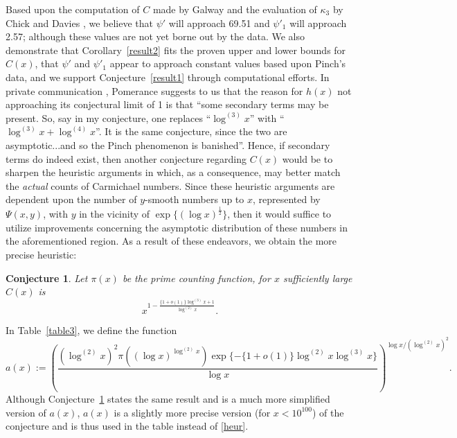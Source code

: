 \documentclass[11pt]{article}
\theoremstyle{plain}
\newtheorem{conj}[subsubsection]{Conjecture}
\theoremstyle{definition}
\theoremstyle{remark}
\numberwithin{equation}{subsection}
\begin{document}
\indent Based upon the computation of $C$ made by Galway \cite{3} and the evaluation of $\kappa_3$ by Chick and Davies \cite{14}, we believe that $\psi'$ will approach 69.51 and $\psi'_1$ will approach 2.57; although these values are not yet borne out by the data.
We also demonstrate that Corollary~\ref{result2} fits the proven upper and lower bounds for $C(x)$, that $\psi'$ and $\psi'_1$ appear to approach constant values based upon Pinch's data, and we support Conjecture~\ref{result1} through computational efforts.\newline
\indent In private communication \cite{28}, Pomerance suggests to us that the reason for $h(x)$ not approaching its conjectural limit of 1 is that ``some secondary terms may be present.  So, say in my conjecture,
one replaces ``$\log^{(3)} x$'' with ``$\log^{(3)} x + \log^{(4)} x$''. It is the same conjecture, since the two are asymptotic...and so the Pinch phenomenon is banished''. Hence, if secondary terms do indeed exist, then another conjecture regarding $C(x)$ would be to sharpen the heuristic arguments in \cite{11} which, as a consequence, may better match the \emph{actual} counts of Carmichael numbers. Since these heuristic arguments are dependent upon the number of $y$-smooth numbers up to $x$, represented by $\Psi(x,y)$, with $y$ in the vicinity of $\exp\{(\log x)^{\frac{1}{2}}\}$, then it would suffice to utilize improvements concerning the asymptotic distribution of these numbers in the aforementioned region. As a result of these endeavors, we obtain the more precise heuristic:
\begin{conj} \label{result3}
Let $\pi(x)$ be the prime counting function, for $x$ sufficiently large $C(x)$ is
\begin{equation} \label{heur}x^{1-{\frac{\{1+o(1)\}\log^{(3)} x + 1}{\log^{(2)} x}}}.
\end{equation}
\end{conj}
\indent In Table~\ref{table3}, we define the function
$$
a(x) := \left(\frac{(\log^{(2)} x)^2 \pi((\log x)^{\log^{(2)} x})\exp\{-\{1+o(1)\}\log^{(2)} x \log^{(3)} x\}}{\log x}\right)^{\log x/(\log^{(2)} x)^2}.
$$
Although Conjecture~\ref{result3} states the same result and is a much more simplified version of $a(x)$, $a(x)$ is a slightly more precise version (for $x < 10^{100}$) of the conjecture and is thus used in the table instead of \eqref{heur}.\newline
\end{document}
